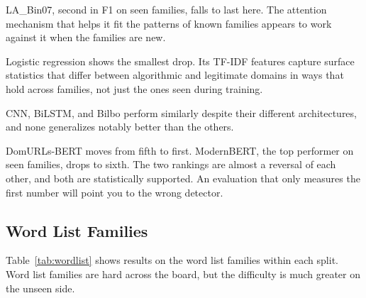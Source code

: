 \documentclass[conference]{IEEEtran}
\begin{document}
LA\_Bin07, second in F1 on seen families, falls to last here. The attention mechanism that helps it fit the patterns of known families appears to work against it when the families are new.

Logistic regression shows the smallest drop. Its TF-IDF features capture surface statistics that differ between algorithmic and legitimate domains in ways that hold across families, not just the ones seen during training.

CNN, BiLSTM, and Bilbo perform similarly despite their different architectures, and none generalizes notably better than the others.

DomURLs-BERT moves from fifth to first. ModernBERT, the top performer on seen families, drops to sixth. The two rankings are almost a reversal of each other, and both are statistically supported. An evaluation that only measures the first number will point you to the wrong detector.

\subsection{Word List Families}
\label{sec:wordlist}

Table~\ref{tab:wordlist} shows results on the word list families within each split. Word list families are hard across the board, but the difficulty is much greater on the unseen side.
\end{document}
